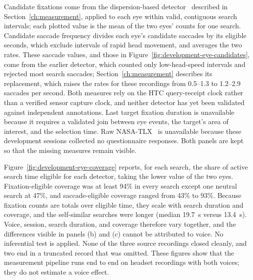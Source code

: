 Candidate fixations come from the dispersion-based detector~\cite{salvucci2000fixations} described in Section~\ref{ch:measurement}, applied to each eye within valid, contiguous search intervals; each plotted value is the mean of the two eyes' counts for one search. Candidate saccade frequency divides each eye's candidate saccades by its eligible seconds, which exclude intervals of rapid head movement, and averages the two rates. These saccade values, and those in Figure~\ref{fig:development-eye-candidates}, come from the earlier detector, which counted only low-head-speed intervals and rejected most search saccades; Section~\ref{ch:measurement} describes its replacement, which raises the rates for these recordings from 0.5--1.3 to 1.2--2.9 saccades per second. Both measures rely on the HTC query-receipt clock rather than a verified sensor capture clock, and neither detector has yet been validated against independent annotations. Last target fixation duration is unavailable because it requires a validated join between eye events, the target's area of interest, and the selection time. Raw NASA-TLX~\cite{hart1988nasatlx} is unavailable because these development sessions collected no questionnaire responses. Both panels are kept so that the missing measures remain visible.

Figure~\ref{fig:development-eye-coverage} reports, for each search, the share of active search time eligible for each detector, taking the lower value of the two eyes. Fixation-eligible coverage was at least 94\% in every search except one neutral search at 47\%, and saccade-eligible coverage ranged from 43\% to 93\%. Because fixation counts are totals over eligible time, they scale with search duration and coverage, and the self-similar searches were longer (median 19.7~s versus 13.4~s). Voice, session, search duration, and coverage therefore vary together, and the differences visible in panels (b) and (c) cannot be attributed to voice. No inferential test is applied. None of the three source recordings closed cleanly, and two end in a truncated record that was omitted. These figures show that the measurement pipeline runs end to end on headset recordings with both voices; they do not estimate a voice effect.

